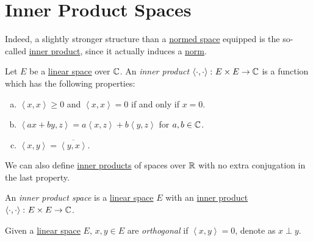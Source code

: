 \section{Inner Product Spaces}
Indeed, a slightly stronger structure than a \hyperref[def:normed-vector-space]{normed space} equipped is the so-called \hyperref[def:inner-product]{inner product}, since it actually induces a \hyperref[def:norm]{norm}.
\begin{definition}\label{def:inner-product}
	Let \(E\) be a \hyperref[def:linear-vector-space]{linear space} over \(\mathbb{\MakeUppercase{c}} \). An \emph{inner product} \(\left\langle \cdot, \cdot \right\rangle \colon E \times E \to \mathbb{\MakeUppercase{c}} \) is a function which has the following properties:
	\begin{enumerate}[(a)]
		\item \(\left\langle x, x \right\rangle \geq 0\) and \(\left\langle x, x \right\rangle = 0\) if and only if \(x = 0\).
		\item \(\left\langle ax + by, z \right\rangle = a\left\langle x, z \right\rangle + b \left\langle y, z \right\rangle  \) for \(a, b\in \mathbb{\MakeUppercase{c}} \).
		\item \(\left\langle x, y \right\rangle = \overline{\left\langle y, x \right\rangle }\).
	\end{enumerate}
\end{definition}

\begin{notation}
	We can also define \hyperref[def:inner-product]{inner products} of spaces over \(\mathbb{\MakeUppercase{r}} \) with no extra conjugation in the last property.
\end{notation}

\begin{definition}\label{def:inner-product-space}
	An \emph{inner product space} is a \hyperref[def:linear-vector-space]{linear space} \(E\) with an \hyperref[def:inner-product]{inner product} \(\left\langle \cdot, \cdot \right\rangle \colon E\times E\to \mathbb{\MakeUppercase{c}} \).
\end{definition}
\begin{definition}[Orthogonal]\label{def:orthogonal}
	Given a \hyperref[def:linear-vector-space]{linear space} \(E\), \(x, y\in E\) are \emph{orthogonal} if \(\left\langle x, y \right\rangle = 0\), denote as \(x\perp y\).
\end{definition}

